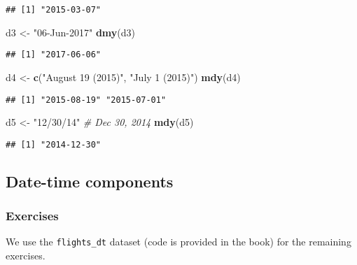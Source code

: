\documentclass[]{article}
\newenvironment{Shaded}{\begin{snugshade}}{\end{snugshade}}
\newcommand{\KeywordTok}[1]{\textcolor[rgb]{0.13,0.29,0.53}{\textbf{#1}}}
\newcommand{\StringTok}[1]{\textcolor[rgb]{0.31,0.60,0.02}{#1}}
\newcommand{\CommentTok}[1]{\textcolor[rgb]{0.56,0.35,0.01}{\textit{#1}}}
\newcommand{\NormalTok}[1]{#1}
\theoremstyle{definition}
\theoremstyle{definition}
\theoremstyle{definition}
\theoremstyle{remark}
\begin{document}
\begin{verbatim}
## [1] "2015-03-07"
\end{verbatim}

\begin{Shaded}
\begin{Highlighting}[]
\NormalTok{d3 <-}\StringTok{ "06-Jun-2017"}
\KeywordTok{dmy}\NormalTok{(d3)}
\end{Highlighting}
\end{Shaded}

\begin{verbatim}
## [1] "2017-06-06"
\end{verbatim}

\begin{Shaded}
\begin{Highlighting}[]
\NormalTok{d4 <-}\StringTok{ }\KeywordTok{c}\NormalTok{(}\StringTok{"August 19 (2015)"}\NormalTok{, }\StringTok{"July 1 (2015)"}\NormalTok{)}
\KeywordTok{mdy}\NormalTok{(d4)}
\end{Highlighting}
\end{Shaded}

\begin{verbatim}
## [1] "2015-08-19" "2015-07-01"
\end{verbatim}

\begin{Shaded}
\begin{Highlighting}[]
\NormalTok{d5 <-}\StringTok{ "12/30/14"} \CommentTok{# Dec 30, 2014}
\KeywordTok{mdy}\NormalTok{(d5)}
\end{Highlighting}
\end{Shaded}

\begin{verbatim}
## [1] "2014-12-30"
\end{verbatim}

\subsection{Date-time components}\label{date-time-components}

\subsubsection{Exercises}\label{exercises-41}

We use the \texttt{flights\_dt} dataset (code is provided in the book)
for the remaining exercises.
\end{document}
